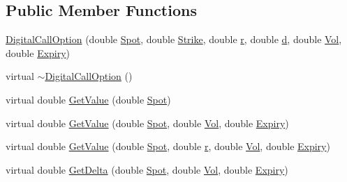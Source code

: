 \subsection*{Public Member Functions}
\begin{DoxyCompactItemize}
\item 
\hyperlink{classMyOption_1_1DigitalCallOption_ab09ac328d7fe9da0ba735c36e9929ad5}{Digital\+Call\+Option} (double \hyperlink{classMyOption_1_1Option_a6c6f01d75cde7e92d16a6d8d6f331a1d}{Spot}, double \hyperlink{classMyOption_1_1Option_a3033c483588ce26b175280c7f9dee8d1}{Strike}, double \hyperlink{classMyOption_1_1Option_aa8cb250427dece65ea49255d4102cc8d}{r}, double \hyperlink{classMyOption_1_1Option_a500979f4b32262594d895c4a83b58d1d}{d}, double \hyperlink{classMyOption_1_1Option_a5d6002c14b335c782873bf1437113513}{Vol}, double \hyperlink{classMyOption_1_1Option_ac1adacb417fede41d151b9cda05bcb3d}{Expiry})
\item 
virtual \hyperlink{classMyOption_1_1DigitalCallOption_acc2d14a2b95f2a43ee8a09b39591a071}{$\sim$\+Digital\+Call\+Option} ()
\item 
virtual double \hyperlink{classMyOption_1_1DigitalCallOption_a9c05c136304f5b2112ed87859c5a944a}{Get\+Value} (double \hyperlink{classMyOption_1_1Option_a6c6f01d75cde7e92d16a6d8d6f331a1d}{Spot})
\item 
virtual double \hyperlink{classMyOption_1_1DigitalCallOption_a353ecc50b8e9efa5c4c2cc06454760b6}{Get\+Value} (double \hyperlink{classMyOption_1_1Option_a6c6f01d75cde7e92d16a6d8d6f331a1d}{Spot}, double \hyperlink{classMyOption_1_1Option_a5d6002c14b335c782873bf1437113513}{Vol}, double \hyperlink{classMyOption_1_1Option_ac1adacb417fede41d151b9cda05bcb3d}{Expiry})
\item 
virtual double \hyperlink{classMyOption_1_1DigitalCallOption_a75391ad8c6b599e0c181c965d01cd610}{Get\+Value} (double \hyperlink{classMyOption_1_1Option_a6c6f01d75cde7e92d16a6d8d6f331a1d}{Spot}, double \hyperlink{classMyOption_1_1Option_aa8cb250427dece65ea49255d4102cc8d}{r}, double \hyperlink{classMyOption_1_1Option_a5d6002c14b335c782873bf1437113513}{Vol}, double \hyperlink{classMyOption_1_1Option_ac1adacb417fede41d151b9cda05bcb3d}{Expiry})
\item 
virtual double \hyperlink{classMyOption_1_1DigitalCallOption_a58446219e938256d1f451930350737b7}{Get\+Delta} (double \hyperlink{classMyOption_1_1Option_a6c6f01d75cde7e92d16a6d8d6f331a1d}{Spot}, double \hyperlink{classMyOption_1_1Option_a5d6002c14b335c782873bf1437113513}{Vol}, double \hyperlink{classMyOption_1_1Option_ac1adacb417fede41d151b9cda05bcb3d}{Expiry})

\end{DoxyCompactItemize}
